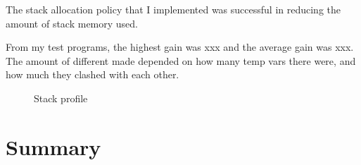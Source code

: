 \documentclass[00-main.tex]{subfiles}
\begin{document}
The stack allocation policy that I implemented was successful in reducing the amount of stack memory used.

From my test programs, the highest gain was xxx and the average gain was xxx.
The amount of different made depended on how many temp vars there were, and how much they clashed with each other.

\begin{figure}[h]
  \centering
  \caption{Stack profile}
  \label{fig:}
\end{figure}

\section{Summary}
\end{document}

